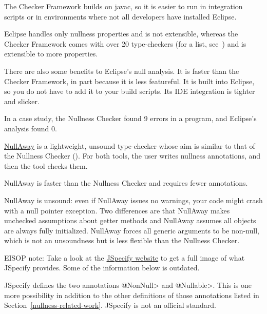 The Checker Framework builds on javac, so it is easier to run in
integration scripts or in
environments where not all developers have installed Eclipse.

Eclipse handles only nullness properties and is not extensible, whereas the
Checker Framework comes with over 20 type-checkers (for a list,
see~) and is extensible to more properties.

There are also some benefits to Eclipse's null analysis.
It is faster than the Checker Framework, in part because it is less featureful.
It is built into Eclipse, so you do not have to add it to your build scripts.
Its IDE integration is tighter and slicker.

In a case study, the Nullness Checker found 9 errors in a program, and
Eclipse's analysis found 0.



\href{https://github.com/uber/NullAway}{NullAway} is a lightweight, unsound
type-checker whose aim is similar to that of the Nullness Checker
().  For both tools, the user writes
nullness annotations, and then the tool checks them.

NullAway is faster than the Nullness Checker and requires fewer annotations.

NullAway is unsound:  even if NullAway issues no warnings, your code might
crash with a null pointer exception.  Two differences are that NullAway
makes unchecked assumptions about getter methods and NullAway assumes all
objects are always fully initialized.  NullAway forces all generic
arguments to be non-null, which is not an unsoundness but is less flexible
than the Nullness Checker.



EISOP note: Take a look at the \href{https://jspecify.dev/}{JSpecify website}
to get a full image of what JSpecify provides. Some of the information
below is outdated.

JSpecify defines the two annotations \<@NonNull> and \<@Nullable>.  This is
one more possibility in addition to the other definitions of those
annotations listed in Section~\ref{nullness-related-work}.  JSpecify is not
an official standard.

